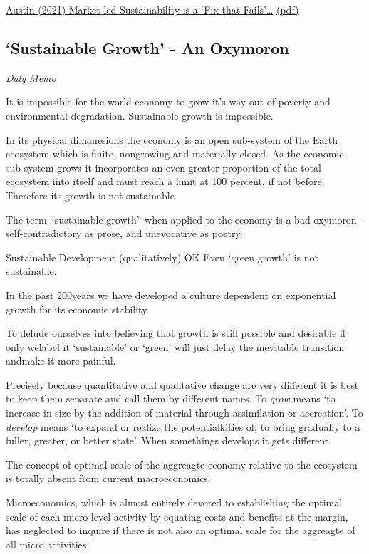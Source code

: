 \documentclass[
]{book}
\begin{document}
\href{https://bothbrainsrequired.com/2021/10/25/fix-that-fails/}{Austin (2021) Market-led Sustainability is a `Fix that Fails'\ldots{}}
\href{pdf/Austin_2021_Market_Led_Sustainability_Fix_Fails.pdf}{(pdf)}

\hypertarget{sustainable-growth---an-oxymoron}{%
\subsection{`Sustainable Growth' - An Oxymoron}\label{sustainable-growth---an-oxymoron}}

\emph{Daly Memo}

It is impossible for the world economy to grow it's way out of poverty and
environmental degradation. Sustainable growth is impossible.

In its physical dimanesions the economy is an open sub-system of the Earth ecosystem
which is finite, nongrowing and materially closed.
As the economic sub-system grows it incorporates an even greater proportion
of the total ecosystem into itself and must reach a limit at 100 percent,
if not before.
Therefore its growth is not sustainable.

The term ``sustainable growth'' when applied to the economy is a bad oxymoron -
self-contradictory as prose, and unevocative as poetry.

Sustainable Development (qualitatively) OK
Even `green growth' is not sustainable.

In the past 200years we have developed a culture dependent on
exponential growth for its economic stability.

To delude ourselves into believing that growth is still possible and desirable
if only welabel it `sustainable' or `green' will just delay the inevitable
transition andmake it more painful.

Precisely because quantitative and qualitative change are very different it is
best to keep them separate and call them by different names.
To \emph{grow} means `to increase in size by the addition of material through
assimilation or accreation'.
To \emph{develop} means `to expand or realize the potentialkities of;
to bring gradually to a fuller, greater, or better state'.
When somethings develops it gets different.

The concept of optimal scale of the aggreagte economy relative to the ecosystem
is totally absent from current macroeconomics.

Microeconomics, which is almost entirely devoted to establishing the optimal scale
of each micro level activity by equating costs and benefits at the margin, has
neglected to inquire if there is not also an optimal scale for the aggreagte of
all micro activities.
\end{document}
